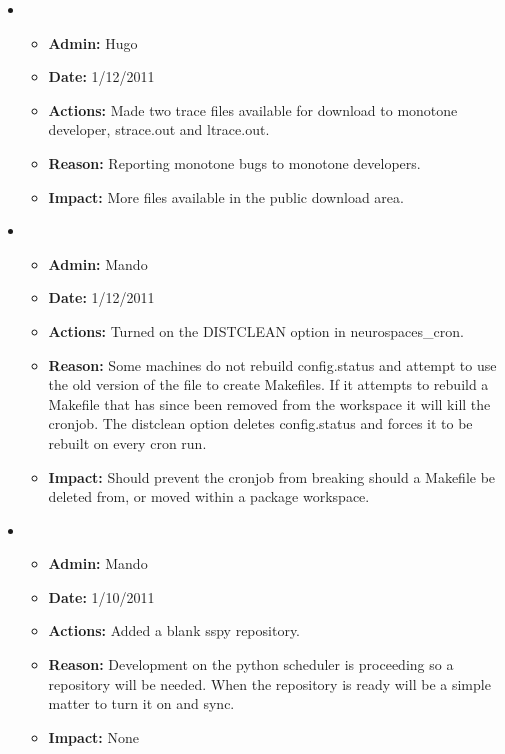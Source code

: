 \documentclass[12pt]{article}
\begin{document}
\begin{itemize}
	

\item
\begin{itemize}
\item[] {\bf Admin:} Hugo
\item[] {\bf Date:} 1/12/2011 
\item[] {\bf Actions:} Made two trace files available for download to monotone developer, strace.out and ltrace.out.
\item[] {\bf Reason:} Reporting monotone bugs to monotone developers.
\item[] {\bf Impact:} More files available in the public download area.
\end{itemize}

\item
\begin{itemize}
\item[] {\bf Admin:} Mando
\item[] {\bf Date:} 1/12/2011 
\item[] {\bf Actions:} Turned on the DISTCLEAN option in neurospaces\_cron.
\item[] {\bf Reason:} Some machines do not rebuild config.status and attempt to use the old version of the file to create Makefiles. If it attempts to rebuild a Makefile that has since been removed from the workspace it will kill the cronjob. The distclean option deletes config.status and forces it to be rebuilt on every cron run. 
\item[] {\bf Impact:} Should prevent the cronjob from breaking should a Makefile be deleted from, or moved within a package workspace.
\end{itemize}

\item
\begin{itemize}
\item[] {\bf Admin:} Mando
\item[] {\bf Date:} 1/10/2011 
\item[] {\bf Actions:} Added a blank sspy repository.
\item[] {\bf Reason:} Development on the python scheduler is proceeding so a repository will be needed. When the repository is ready will be a simple matter to turn it on and sync. 
\item[] {\bf Impact:} None
\end{itemize}


\end{itemize}
\end{document}
